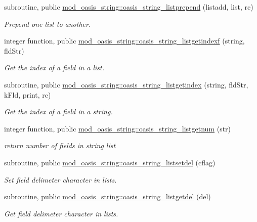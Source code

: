 \begin{DoxyCompactItemize}
subroutine, public \hyperlink{namespacemod__oasis__string_a7df42cce90ae7fa5eceb0b9f2e4bf169}{mod\+\_\+oasis\+\_\+string\+::oasis\+\_\+string\+\_\+listprepend} (listadd, list, rc)
\begin{DoxyCompactList}\small\item\em Prepend one list to another. \end{DoxyCompactList}\item 
integer function, public \hyperlink{namespacemod__oasis__string_a66bedb9c90f129c44087bf3f3c26bdb7}{mod\+\_\+oasis\+\_\+string\+::oasis\+\_\+string\+\_\+listgetindexf} (string, fld\+Str)
\begin{DoxyCompactList}\small\item\em Get the index of a field in a list. \end{DoxyCompactList}\item 
subroutine, public \hyperlink{namespacemod__oasis__string_a6e2bf29a9030f16e3a58d0302ab793f2}{mod\+\_\+oasis\+\_\+string\+::oasis\+\_\+string\+\_\+listgetindex} (string, fld\+Str, k\+Fld, print, rc)
\begin{DoxyCompactList}\small\item\em Get the index of a field in a string. \end{DoxyCompactList}\item 
integer function, public \hyperlink{namespacemod__oasis__string_a15a49e6a71df520424402a753be10bb1}{mod\+\_\+oasis\+\_\+string\+::oasis\+\_\+string\+\_\+listgetnum} (str)
\begin{DoxyCompactList}\small\item\em return number of fields in string list \end{DoxyCompactList}\item 
subroutine, public \hyperlink{namespacemod__oasis__string_a4229e0726d97fc10f17027caea332daf}{mod\+\_\+oasis\+\_\+string\+::oasis\+\_\+string\+\_\+listsetdel} (cflag)
\begin{DoxyCompactList}\small\item\em Set field delimeter character in lists. \end{DoxyCompactList}\item 
subroutine, public \hyperlink{namespacemod__oasis__string_a0ed07993c2e7d09baffe933c6075f154}{mod\+\_\+oasis\+\_\+string\+::oasis\+\_\+string\+\_\+listgetdel} (del)
\begin{DoxyCompactList}\small\item\em Get field delimeter character in lists. \end{DoxyCompactList}\item 

\end{DoxyCompactItemize}

